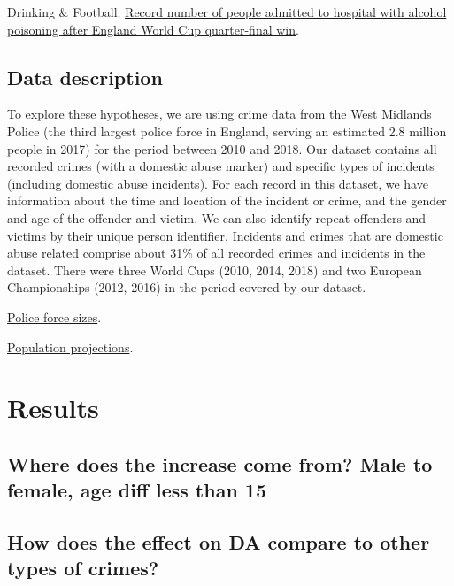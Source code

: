 \documentclass[12pt, letterpaper]{article}
\begin{document}
Drinking \& Football: \href{https://www.independent.co.uk/news/health/world-cup-2018-england-vs-sweden-alcohol-poisoning-hospital-record-number-quarter-semi-final-croatia-a8702961.html}{Record number of people admitted to hospital with alcohol poisoning after England World Cup quarter-final win}.

\subsection{Data description}

To explore these hypotheses, we are using crime data from the West Midlands Police (the third largest police force in England, serving an estimated 2.8 million people in 2017) for the period between 2010 and 2018. Our dataset contains all recorded crimes (with a domestic abuse marker) and specific types of incidents (including domestic abuse incidents). For each record in this dataset, we have information about the time and location of the incident or crime, and the gender and age of the offender and victim. We can also identify repeat offenders and victims by their unique person identifier. Incidents and crimes that are domestic abuse related comprise about 31\% of all recorded crimes and incidents in the dataset. There were three World Cups (2010, 2014, 2018) and two European Championships (2012, 2016) in the period covered by our dataset. 

\href{https://www.gov.uk/government/statistics/police-funding-for-england-and-wales-2015-to-2019}{Police force sizes}.

\href{https://www.nomisweb.co.uk/reports/lmp/la/1967128614/report.aspx#tabrespop}{Population projections}.




\section{Results}

\subsection{Where does the increase come from? Male to female, age diff less than 15}

\subsection{How does the effect on DA compare to other types of crimes?}
\end{document}
